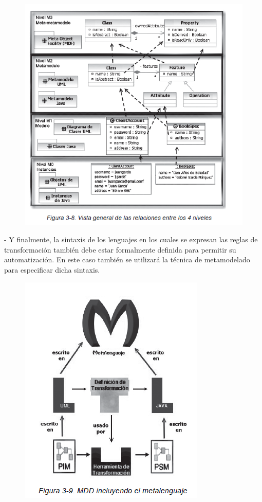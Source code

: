 \begin{figure}[H]
\centering
\includegraphics[scale=0.9]{./Imagenes/modelo14}
\end{figure}

- Y finalmente, la sintaxis de los lenguajes en los cuales se expresan
las reglas de transformación también debe estar formalmente definida
para permitir su automatización. En este caso también se utilizará
la técnica de metamodelado para especificar dicha sintaxis.

\begin{figure}[H]
\centering
\includegraphics[scale=0.9]{./Imagenes/modelo15}
\end{figure}


